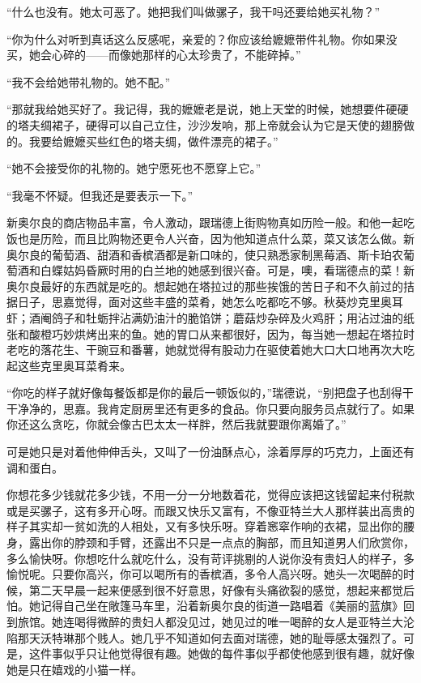 \par “什么也没有。她太可恶了。她把我们叫做骡子，我干吗还要给她买礼物？”
\par “你为什么对听到真话这么反感呢，亲爱的？你应该给嬷嬷带件礼物。你如果没买，她会心碎的——而像她那样的心太珍贵了，不能碎掉。”
\par “我不会给她带礼物的。她不配。”
\par “那就我给她买好了。我记得，我的嬷嬷老是说，她上天堂的时候，她想要件硬硬的塔夫绸裙子，硬得可以自己立住，沙沙发响，那上帝就会认为它是天使的翅膀做的。我要给嬷嬷买些红色的塔夫绸，做件漂亮的裙子。”
\par “她不会接受你的礼物的。她宁愿死也不愿穿上它。”
\par “我毫不怀疑。但我还是要表示一下。”
\par 新奥尔良的商店物品丰富，令人激动，跟瑞德上街购物真如历险一般。和他一起吃饭也是历险，而且比购物还更令人兴奋，因为他知道点什么菜，菜又该怎么做。新奥尔良的葡萄酒、甜酒和香槟酒都是新口味的，使只熟悉家制黑莓酒、斯卡珀农葡萄酒和白蝶姑妈昏厥时用的白兰地的她感到很兴奋。可是，噢，看瑞德点的菜！新奥尔良最好的东西就是吃的。想起她在塔拉过的那些挨饿的苦日子和不久前过的拮据日子，思嘉觉得，面对这些丰盛的菜肴，她怎么吃都吃不够。秋葵炒克里奥耳虾；酒阉鸽子和牡蛎拌沾满奶油汁的脆馅饼；蘑菇炒杂碎及火鸡肝；用沾过油的纸张和酸橙巧妙烘烤出来的鱼。她的胃口从来都很好，因为，每当她一想起在塔拉时老吃的落花生、干豌豆和番薯，她就觉得有股动力在驱使着她大口大口地再次大吃起这些克里奥耳菜肴来。
\par “你吃的样子就好像每餐饭都是你的最后一顿饭似的，”瑞德说，“别把盘子也刮得干干净净的，思嘉。我肯定厨房里还有更多的食品。你只要向服务员点就行了。如果你还这么贪吃，你就会像古巴太太一样胖，然后我就要跟你离婚了。”
\par 可是她只是对着他伸伸舌头，又叫了一份油酥点心，涂着厚厚的巧克力，上面还有调和蛋白。
\par 你想花多少钱就花多少钱，不用一分一分地数着花，觉得应该把这钱留起来付税款或是买骡子，这有多开心呀。而跟又快乐又富有，不像亚特兰大人那样装出高贵的样子其实却一贫如洗的人相处，又有多快乐呀。穿着窸窣作响的衣裙，显出你的腰身，露出你的脖颈和手臂，还露出不只是一点点的胸部，而且知道男人们欣赏你，多么愉快呀。你想吃什么就吃什么，没有苛评挑剔的人说你没有贵妇人的样子，多愉悦呢。只要你高兴，你可以喝所有的香槟酒，多令人高兴呀。她头一次喝醉的时候，第二天早晨一起来便感到很不好意思，好像有头痛欲裂的感觉，想起来都觉后怕。她记得自己坐在敞篷马车里，沿着新奥尔良的街道一路唱着《美丽的蓝旗》回到旅馆。她连喝得微醉的贵妇人都没见过，她见过的唯一喝醉的女人是亚特兰大沦陷那天沃特琳那个贱人。她几乎不知道如何去面对瑞德，她的耻辱感太强烈了。可是，这件事似乎只让他觉得很有趣。她做的每件事似乎都使他感到很有趣，就好像她是只在嬉戏的小猫一样。
